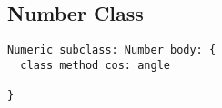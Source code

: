 \subsection{Number Class}

\begin{lstlisting}
Numeric subclass: Number body: {
  class method cos: angle
  
}
\end{lstlisting}